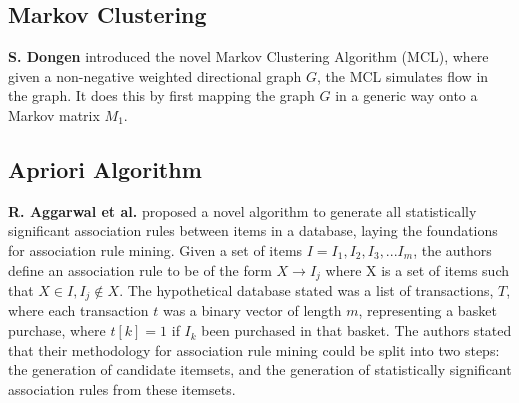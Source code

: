 \documentclass[paper=a4,fontsize=11pt]{report}	%
\begin{document}
\subsection{Markov Clustering}
\textbf{S. Dongen} \cite{markov_clustering} introduced the novel Markov Clustering Algorithm (MCL), where given a non-negative weighted directional graph $G$, the MCL simulates flow in the graph. It does this by first mapping the graph $G$ in a generic way onto a Markov matrix $M_1$.


\subsection{Apriori Algorithm}
\textbf{R. Aggarwal et al.} \cite{mine} proposed a novel algorithm to generate all statistically significant association rules between items in a database, laying the foundations for association rule mining.  Given a set of items $I = I_1, I_2, I_3,...I_m$, the authors define an association rule to be of the form $X \rightarrow I_j$ where X is a set of items such that $X \in I, I_j \notin X$.  The hypothetical database stated was a list of transactions, $T$, where each transaction $t$ was a binary vector of length $m$, representing a basket purchase, where $t[k] = 1$ if $I_k$ been purchased in that basket.  The authors stated that their methodology for association rule mining could be split into two steps: the generation of candidate itemsets, and the generation of statistically significant association rules from these itemsets. \\
\end{document}
